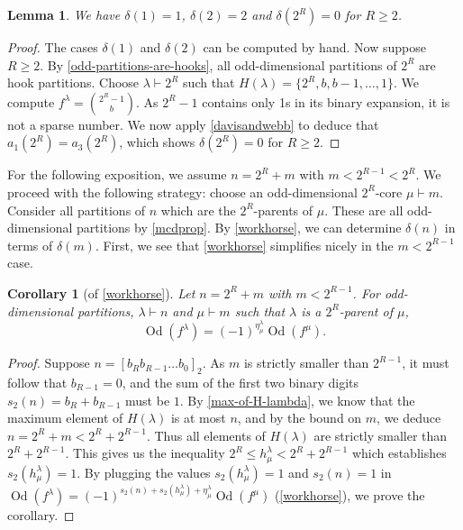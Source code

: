 \documentclass[12pt]{amsart}
\newtheorem{lemma}[theorem]{Lemma}
\newtheorem{corollary}[theorem]{Corollary}
\theoremstyle{definition}
\numberwithin{equation}{section}
\newcommand{\la}{\lambda}
\DeclareMathOperator{\Od}{Od}
\begin{document}
\begin{lemma}\label{lem:hookdims}
We have $\delta(1) = 1$, $\delta(2) = 2$ and $\delta(2^R) = 0$ for $R \geq 2$.
\end{lemma}
\begin{proof}
The cases $\delta(1)$ and $\delta(2)$ can be computed by hand. Now suppose $R \geq 2$. By \cref{odd-partitions-are-hooks}, all odd-dimensional partitions of $2^R$ are hook partitions. Choose $\lambda\vdash 2^R$ such that $H(\lambda) = \{2^R, b, b-1, \ldots, 1\}$. We compute $f^{\lambda} = \binom{2^R-1}{b}$. As $2^R - 1$ contains only 1s in its binary expansion, it is not a sparse number. We now apply \cref{davisandwebb} to deduce that $a_1(2^R) = a_3(2^R)$, which shows $\delta(2^R) = 0$ for $R \geq 2$. 
\end{proof}

For the following exposition, we assume $n = 2^R + m$ with $m < 2^{R-1} < 2^R$. We proceed with the following strategy: choose an odd-dimensional  $2^R$-core $\mu\vdash m$. Consider all partitions of $n$ which are the $2^R$-parents of $\mu$. These are all odd-dimensional partitions by \cref{mcdprop}. By \cref{workhorse}, we can determine $\delta(n)$ in terms of $\delta(m)$. First, we see that \cref{workhorse} simplifies nicely in the $m < 2^{R-1}$ case.
\begin{corollary}[of \cref{workhorse}]\label{cor:sparse-workshorse}
Let $n = 2^R + m$ with $m < 2^{R-1}$. For odd-dimensional partitions, $\lambda \vdash n$ and $\mu\vdash m$ such that $\lambda$ is a $2^R$-parent of $\mu$, 
\[
\Od(f^{\lambda}) = (-1)^{\eta^\lambda_\mu}\Od(f^\mu).
\]
\end{corollary}
\begin{proof}
Suppose $n = [b_Rb_{R-1}\ldots b_0]_2$. As $m$ is strictly smaller than $2^{R-1}$, it must follow that $b_{R-1} = 0$, and the sum of the first two binary digits $s_2(n) = b_R + b_{R-1}$ must be $1$. By \cref{max-of-H-lambda}, we know that the maximum element of $H(\la)$ is at most  $n$, and by the bound on $m$, we deduce $n = 2^R + m < 2^{R} + 2^{R-1}$. Thus all elements of $H(\lambda)$ are strictly smaller than $2^R + 2^{R-1}$. This gives us the inequality $2^R \leq h^\lambda_\mu < 2^R + 2^{R-1}$ which establishes $s_2(h^\lambda_\mu) = 1$. By plugging the values  $s_2(h^\lambda_\mu) = 1$ and  $s_2(n) = 1$ in $
\Od(f^{\lambda}) = (-1)^{s_2(n) + s_2(h^\lambda_\mu) + \eta^\lambda_\mu}\Od(f^{\mu})$ (\cref{workhorse}), we prove the corollary.
\end{proof}
\end{document}
